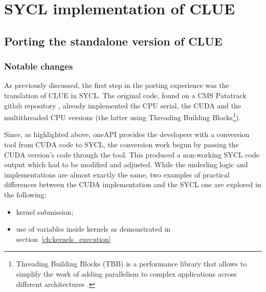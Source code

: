 \chapter{SYCL implementation of CLUE}
\label{ch:3}
\section{Porting the standalone version of CLUE}
\subsection{Notable changes}
As previously discussed, the first step in the porting experience was the translation of CLUE in SYCL. The original code, found on a CMS Patatrack gitlab repository \cite{clue_repo}, already implemented the CPU serial, the CUDA and the multithreaded CPU versions (the latter using Threading Building Blocks\footnote{Threading Building Blocks (TBB) is a performance library that allows to simplify the work of adding parallelism to complex applications across different architectures \cite{TBB}.}). 

Since, as highlighted above, oneAPI provides the developers with a conversion tool from CUDA code to SYCL, the conversion work begun by passing the CUDA version's code through the tool. This produced a non-working SYCL code output which had to be modified and adjusted. While the underling logic and implementations are almost exactly the same, two examples of practical differences between the CUDA implementation and the SYCL one are explored in the following: 
\begin{itemize}
    \item kernel submission;
    \item use of variables inside kernels as demonstrated in section~\ref{ch:kernels_execution}
\end{itemize}
